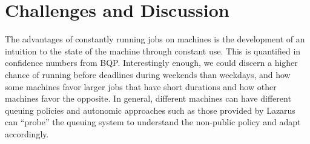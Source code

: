 \documentclass{sig-alternate}
\newcommand{\up}{\vspace*{-0.3em}}
\begin{document}
\up\up
\begin{table}
\caption{
  The decision on resource and resource configuration is guided by BQP.  
  A table showing the BQP results for the resources selected, and 
  the configuration of the resources as determined, by the
  number of cores (for the BigJob), duration and queue.
  Data in this table is for identical experiments involving
  machines Ranger, QB and Abe, but repeated
  ten different times. 
  As can be seen, the use of BQP guides the choice of resource and resource configuration  to vary.
  In contrast, when BQP is not used, 
  the default choice for the BigJob size is always 64 with a duration fixed
  at 2:00 hours (although the chosen queue varies). So although there is not 
  much change between different BQP-guided runs,  there is significant
  difference between BQP-guided and manual (unassisted) resource configurations}\up\up\up\up\up\up
\end{table}

\section{Challenges and Discussion}

The advantages of constantly running jobs on machines is the
development of an intuition to the state of the machine through
constant use. This is quantified in confidence numbers from
BQP. Interestingly enough, we could discern a higher chance of running
before deadlines during weekends than weekdays, and how some machines
favor larger jobs that have short durations and how other machines
favor the opposite. In general, different machines can have different
queuing policies and autonomic approaches such as those provided by
Lazarus can ``probe'' the queuing system to understand the non-public
policy and adapt accordingly.
\end{document}
